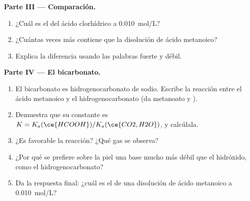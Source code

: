 \begin{problem}
\medskip
\noindent\textbf{Parte III --- Comparación.}
\begin{enumerate}[resume]
  \item ¿Cuál es el  del ácido clorhídrico a \qty{0.010}{mol/L}?
  \item ¿Cuántas veces más  contiene que la disolución de
        ácido metanoico?
  \item Explica la diferencia usando las palabras fuerte y débil.
\end{enumerate}

\medskip
\noindent\textbf{Parte IV --- El bicarbonato.}
\begin{enumerate}[resume]
  \item El bicarbonato es hidrogenocarbonato de sodio. Escribe la
        reacción entre el ácido metanoico y el  hidrogenocarbonato (da
        metanoato y ).
  \item Demuestra que su constante es $K = K_a(\ce{HCOOH}) / K_a(\ce{CO2,H2O})$,
        y calcúlala.
  \item ¿Es favorable la reacción? ¿Qué gas se observa?
  \item ¿Por qué se prefiere sobre la piel una base mucho más débil que
        el hidróxido, como el hidrogenocarbonato?
  \item Da la respuesta final: ¿cuál es el  de una disolución de ácido
        metanoico a \qty{0.010}{mol/L}?
\end{enumerate}
\end{problem}
